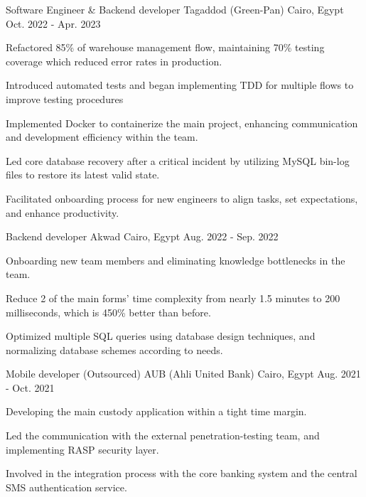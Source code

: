 \begin{cventries}
  \cventry
    {Software Engineer \& Backend developer} %
    {Tagaddod (Green-Pan)} %
    {Cairo, Egypt} %
    {Oct. 2022 - Apr. 2023} %
    {
      \begin{cvitems} %
        \item {Refactored 85\% of warehouse management flow, maintaining 70\% testing coverage which reduced error rates in production.}
        \item {Introduced automated tests and began implementing TDD for multiple flows to improve testing procedures}
        \item {Implemented Docker to containerize the main project, enhancing communication and development efficiency within the team.}
        \item {Led core database recovery after a critical incident by utilizing MySQL bin-log files to restore its latest valid state.
              }
        \item {Facilitated onboarding process for new engineers to align tasks, set expectations, and enhance productivity.}
      \end{cvitems}
    }

  \cventry
    {Backend developer} %
    {Akwad} %
    {Cairo, Egypt} %
    {Aug. 2022 - Sep. 2022} %
    {
      \begin{cvitems} %
        \item {Onboarding new team members and eliminating knowledge bottlenecks in the team.}
        \item {Reduce 2 of the main forms' time complexity from nearly 1.5 minutes to 200 milliseconds, which is 450\% better than before.}
        \item {Optimized multiple SQL queries using database design techniques, and normalizing database schemes according to needs.}
      \end{cvitems}
    }

  \cventry
    {Mobile developer (Outsourced)} %
    {AUB (Ahli United Bank)} %
    {Cairo, Egypt} %
    {Aug. 2021 - Oct. 2021} %
    {
      \begin{cvitems} %
        \item {Developing the main custody application within a tight time margin.}
        \item {Led the communication with the external penetration-testing team, and implementing RASP security layer.}
        \item {Involved in the integration process with the core banking system and the central SMS authentication service.}
      \end{cvitems}
    }


\end{cventries}
